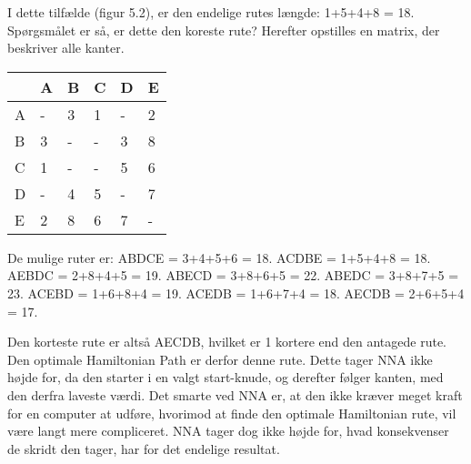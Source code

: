 I dette tilfælde (figur 5.2), er den endelige rutes længde: 1+5+4+8 = 18. Spørgsmålet er så, er dette den koreste rute? Herefter opstilles en matrix, der beskriver alle kanter.

\begin{tabular}{| l | l | l | l | l | l |}
	\hline
	& A & B & C & D & E \\ \hline
	A & - & 3 & 1 & - & 2 \\ \hline
	B & 3 & - & - & 3 & 8 \\ \hline
	C & 1 & - & - & 5 & 6 \\ \hline
	D & - & 4 & 5 & - & 7 \\ \hline
	E & 2 & 8 & 6 & 7 & - \\
	\hline
\end{tabular}\newline


De mulige ruter er: \newline
ABDCE = 3+4+5+6 = 18. \newline
ACDBE = 1+5+4+8 = 18. \newline
AEBDC = 2+8+4+5 = 19. \newline
ABECD = 3+8+6+5 = 22. \newline
ABEDC = 3+8+7+5 = 23. \newline
ACEBD = 1+6+8+4 = 19. \newline
ACEDB = 1+6+7+4 = 18. \newline
AECDB = 2+6+5+4 = 17. \newline

Den korteste rute er altså AECDB, hvilket er 1 kortere end den antagede rute. Den optimale Hamiltonian Path er derfor denne rute. Dette tager NNA ikke højde for, da den starter i en valgt start-knude, og derefter følger kanten, med den derfra laveste værdi. Det smarte ved NNA er, at den ikke kræver meget kraft for en computer at udføre, hvorimod at finde den optimale Hamiltonian rute, vil være langt mere compliceret. NNA tager dog ikke højde for, hvad konsekvenser de skridt den tager, har for det endelige resultat.

